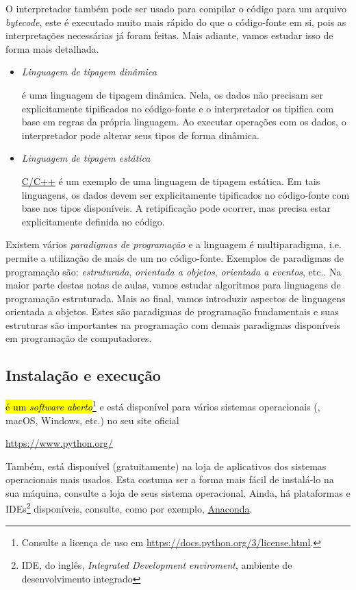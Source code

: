 O interpretador {\python} também pode ser usado para compilar o código para um arquivo \emph{bytecode}, este é executado muito mais rápido do que o código-fonte em si, pois as interpretações necessárias já foram feitas. Mais adiante, vamos estudar isso de forma mais detalhada.

\begin{itemize}
\item \emph{Linguagem de tipagem dinâmica}

  {\python} é uma linguagem de tipagem dinâmica. Nela, os dados não precisam ser explicitamente tipificados no código-fonte e o interpretador os tipifica com base em regras da própria linguagem. Ao executar operações com os dados, o interpretador pode alterar seus tipos de forma dinâmica.

\item \emph{Linguagem de tipagem estática}

  \href{https://pt.wikipedia.org/wiki/C\%2B\%2B}{C/C++} é um exemplo de uma linguagem de tipagem estática. Em tais linguagens, os dados devem ser explicitamente tipificados no código-fonte com base nos tipos disponíveis. A retipificação pode ocorrer, mas precisa estar explicitamente definida no código.
\end{itemize}

Existem vários \emph{paradigmas de programação} e a linguagem {\python} é multiparadigma, i.e. permite a utilização de mais de um no código-fonte. Exemplos de paradigmas de programação são: \emph{estruturada}, \emph{orientada a objetos}, \emph{orientada a eventos}, etc.. Na maior parte destas notas de aulas, vamos estudar algoritmos para linguagens de programação estruturada. Mais ao final, vamos introduzir aspectos de linguagens orientada a objetos. Estes são paradigmas de programação fundamentais e suas estruturas são importantes na programação com demais paradigmas disponíveis em programação de computadores.

\subsection{Instalação e execução}

\hl{{\python} é um \emph{software aberto}}\footnote{Consulte a licença de uso em \url{https://docs.python.org/3/license.html}.} e está disponível para vários sistemas operacionais ({\linux}, macOS, Windows, etc.) no seu site oficial
\begin{center}
  \url{https://www.python.org/}
\end{center}
Também, está disponível (gratuitamente) na loja de aplicativos dos sistemas operacionais mais usados. Esta costuma ser a forma mais fácil de instalá-lo na sua máquina, consulte a loja de seus sistema operacional. Ainda, há plataformas e IDEs\footnote{IDE, do inglês, {\it Integrated Development enviroment}, ambiente de desenvolvimento integrado} {\python} disponíveis, consulte, como por exemplo, \href{https://www.anaconda.com/}{Anaconda}.

